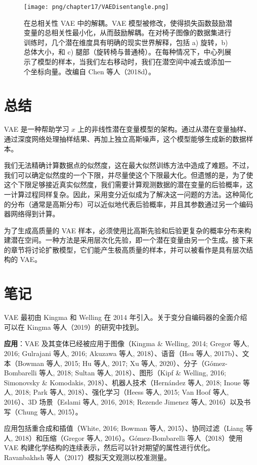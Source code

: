 \begin{figure}[ht!]
\centering
\texttt{[image: png/chapter17/VAEDisentangle.png]}
\caption{在总相关性 VAE 中的解耦。VAE 模型被修改，使得损失函数鼓励潜变量的总相关性最小化，从而鼓励解耦。在对椅子图像的数据集进行训练时，几个潜在维度具有明确的现实世界解释，包括 a) 旋转，b) 总体大小，和 c) 腿部（旋转椅与普通椅）。在每种情况下，中心列展示了模型的样本，当我们左右移动时，我们在潜空间中减去或添加一个坐标向量。改编自 Chen 等人（2018d）。}
\end{figure}


\section{总结}
VAE 是一种帮助学习 \(x\) 上的非线性潜在变量模型的架构。通过从潜在变量抽样、通过深度网络处理抽样结果、再加上独立高斯噪声，这个模型能够生成新的数据样本。

我们无法精确计算数据点的似然度，这在最大似然训练方法中造成了难题。不过，我们可以确定似然度的一个下限，并尽量使这个下限最大化。但遗憾的是，为了使这个下限足够接近真实似然度，我们需要计算观测数据的潜在变量的后验概率，这一计算过程同样复杂。因此，采用变分近似成为了解决这一问题的方法。这种简化的分布（通常是高斯分布）可以近似地代表后验概率，并且其参数通过另一个编码器网络得到计算。

为了生成高质量的 VAE 样本，必须使用比高斯先验和后验更复杂的概率分布来构建潜在空间。一种方法是采用层次化先验，即一个潜在变量由另一个生成。接下来的章节将讨论扩散模型，它们能产生极高质量的样本，并可以被看作是具有层次结构的 VAE。


\section{笔记}
VAE 最初由 Kingma 和 Welling 在 2014 年引入。关于变分自编码器的全面介绍可以在 Kingma 等人（2019）的研究中找到。

\textbf{应用}：VAE 及其变体已经被应用于图像（Kingma \& Welling, 2014; Gregor 等人, 2016; Gulrajani 等人, 2016; Akuzawa 等人, 2018）、语音（Hsu 等人, 2017b）、文本（Bowman 等人, 2015; Hu 等人, 2017; Xu 等人, 2020）、分子（Gómez-Bombarelli 等人, 2018; Sultan 等人, 2018）、图形（Kipf \& Welling, 2016; Simonovsky \& Komodakis, 2018）、机器人技术（Hernández 等人, 2018; Inoue 等人, 2018; Park 等人, 2018）、强化学习（Heess 等人, 2015; Van Hoof 等人, 2016）、3D 场景（Eslami 等人, 2016, 2018; Rezende Jimenez 等人, 2016）以及书写（Chung 等人, 2015）。

应用包括重合成和插值（White, 2016; Bowman 等人, 2015）、协同过滤（Liang 等人, 2018）和压缩（Gregor 等人, 2016）。Gómez-Bombarelli 等人（2018）使用 VAE 构建化学结构的连续表示，然后可以针对期望的属性进行优化。Ravanbakhsh 等人（2017）模拟天文观测以校准测量。

